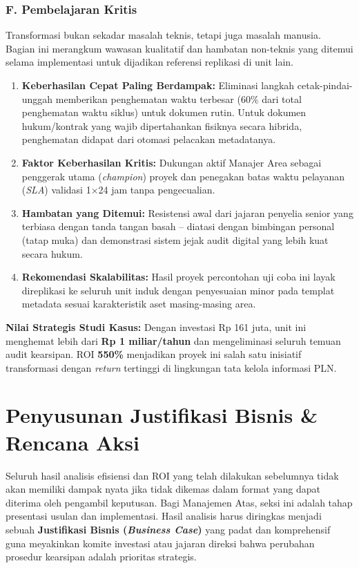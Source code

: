 \documentclass[12pt,a4paper]{report}
\begin{document}
\subsubsection*{F. Pembelajaran Kritis}
Transformasi bukan sekadar masalah teknis, tetapi juga masalah manusia. Bagian ini merangkum wawasan kualitatif dan hambatan non-teknis yang ditemui selama implementasi untuk dijadikan referensi replikasi di unit lain.
\begin{enumerate}[leftmargin=*, nosep]
    \item \textbf{Keberhasilan Cepat Paling Berdampak:} Eliminasi langkah cetak-pindai-unggah memberikan penghematan waktu terbesar (60\% dari total penghematan waktu siklus) untuk dokumen rutin. Untuk dokumen hukum/kontrak yang wajib dipertahankan fisiknya secara hibrida, penghematan didapat dari otomasi pelacakan metadatanya.
    \item \textbf{Faktor Keberhasilan Kritis:} Dukungan aktif Manajer Area sebagai penggerak utama (\textit{champion}) proyek dan penegakan batas waktu pelayanan (\textit{SLA}) validasi 1$\times$24 jam tanpa pengecualian.
    \item \textbf{Hambatan yang Ditemui:} Resistensi awal dari jajaran penyelia senior yang terbiasa dengan tanda tangan basah -- diatasi dengan bimbingan personal (tatap muka) dan demonstrasi sistem jejak audit digital yang lebih kuat secara hukum.
    \item \textbf{Rekomendasi Skalabilitas:} Hasil proyek percontohan uji coba ini layak direplikasi ke seluruh unit induk dengan penyesuaian minor pada templat metadata sesuai karakteristik aset masing-masing area.
\end{enumerate}

\begin{outputbox}
\textbf{Nilai Strategis Studi Kasus:} Dengan investasi Rp 161 juta, unit ini menghemat lebih dari \textbf{Rp 1 miliar/tahun} dan mengeliminasi seluruh temuan audit kearsipan. ROI \textbf{550\%} menjadikan proyek ini salah satu inisiatif transformasi dengan \textit{return} tertinggi di lingkungan tata kelola informasi PLN.
\end{outputbox}

\section{Penyusunan Justifikasi Bisnis \& Rencana Aksi}
Seluruh hasil analisis efisiensi dan ROI yang telah dilakukan sebelumnya tidak akan memiliki dampak nyata jika tidak dikemas dalam format yang dapat diterima oleh pengambil keputusan. Bagi Manajemen Atas, seksi ini adalah tahap presentasi usulan dan implementasi. Hasil analisis harus diringkas menjadi sebuah \textbf{Justifikasi Bisnis (\textit{Business Case})} yang padat dan komprehensif guna meyakinkan komite investasi atau jajaran direksi bahwa perubahan prosedur kearsipan adalah prioritas strategis.
\end{document}
